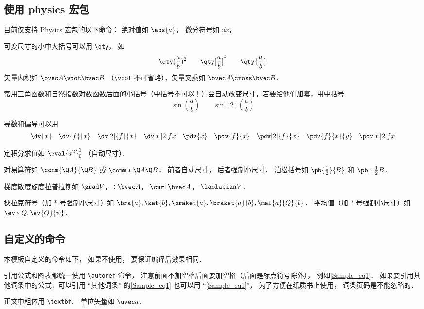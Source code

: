 \subsection{使用 physics 宏包}
目前仅支持 Physics 宏包的以下命令： 绝对值如 $\abs{a}$， 微分符号如 $\dd{x}$，

可变尺寸的小中大括号可以用 \lstinline|\qty|， 如
\begin{equation}
\qty(\frac ab)^2 \qquad \qty[\frac ab]^2 \qquad \qty{ \frac ab}
\end{equation}
矢量内积如 $\bvec A \vdot \bvec B$ （\lstinline|\vdot| 不可省略），矢量叉乘如 $\bvec A\cross\bvec B$．

常用三角函数和自然指数对数函数后面的小括号（中括号不可以！）会自动改变尺寸，若要给他们加幂，用中括号
\begin{equation}
\sin(\frac ab) \qquad \sin[2](\frac ab)
\end{equation}

导数和偏导可以用
\begin{equation}
\dv{x} \quad \dv{f}{x} \quad \dv[2]{f}{x} \quad \dv*[2]{f}{x} \quad
\pdv{x} \quad \pdv{f}{x} \quad \pdv[2]{f}{x} \quad \pdv{f}{x}{y} \quad \pdv*[2]{f}{x}
\end{equation}

定积分求值如 $\eval{x^2}_0^1$ （自动尺寸）．

对易算符如 $\comm{\Q A}{\Q B}$ 或 $\comm*{\Q A}{\Q B}$， 前者自动尺寸， 后者强制小尺寸． 泊松括号如 $\pb{\frac12}{B}$ 和 $\pb*{\frac12}{B}$．

梯度散度旋度拉普拉斯如 $\grad V$，$\div\bvec A$， $\curl\bvec A$， $\laplacian V$．

狄拉克符号（加 * 号强制小尺寸）如 $\bra{a}, \ket{b}, \braket{a}, \braket{a}{b}, \mel{a}{Q}{b}$． 平均值（加 * 号强制小尺寸）如 $\ev*{Q}, \ev{Q}{\psi}$．

\subsection{自定义的命令}
本模板自定义的命令如下， 如果不使用， 要保证编译后效果相同．

引用公式和图表都统一使用 \lstinline|\autoref| 命令， 注意前面不加空格后面要加空格（后面是标点符号除外）， 例如\autoref{Sample_eq1}． 如果要引用其他词条中的公式，可以引用 “其他词条” 的\autoref{Sample_eq1} 也可以用 “\autoref{Sample_eq1}”， 为了方便在纸质书上使用， 词条页码是不能忽略的．

正文中粗体用 \lstinline|\textbf|． 单位矢量如 $\uvec a$．

